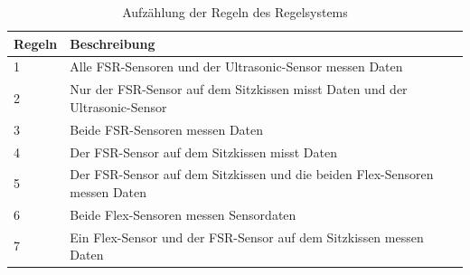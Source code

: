 \begin{table}[H]
	\centering
	\caption[Aufzählung der Regeln des Regelsystems]{Aufzählung der Regeln des Regelsystems}
		\vspace{1.0em}	
	\begin{tabular}{|l|p{7cm}|}
		\hline
		\rowcolor[gray]{0.9}\textbf{Regeln} & \textbf{Beschreibung} \\
		\hline
		\hline
		1 & Alle FSR-Sensoren und der Ultrasonic-Sensor messen Daten \\
		\hline
		2 & Nur der FSR-Sensor auf dem Sitzkissen misst Daten
		    und der Ultrasonic-Sensor \\
		\hline
		3 & Beide FSR-Sensoren messen Daten \\
		\hline
		4 & Der FSR-Sensor auf dem Sitzkissen misst Daten \\
		\hline
		5 & Der FSR-Sensor auf dem Sitzkissen und die beiden Flex-Sensoren messen Daten \\
		\hline
		6 & Beide Flex-Sensoren messen Sensordaten \\
		\hline
		7 & Ein Flex-Sensor und der FSR-Sensor auf dem Sitzkissen messen Daten \\
		\hline
	\end{tabular}
	\label{tab:tablerules}
\end{table}

